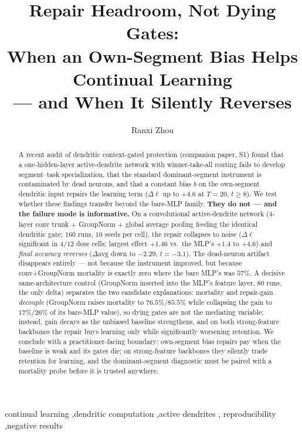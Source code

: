 \documentclass[review]{elsarticle}
\begin{document}
\begin{frontmatter}

\title{Repair Headroom, Not Dying Gates:\\
When an Own-Segment Bias Helps Continual Learning\\
--- and When It Silently Reverses}

\author[inst1]{Ranxi Zhou}

\begin{abstract}
A recent audit of dendritic context-gated protection (companion paper,
S1) found that a one-hidden-layer active-dendrite network with
winner-take-all routing fails to develop segment--task specialization,
that the standard dominant-segment instrument is contaminated by dead
neurons, and that a constant bias $b$ on the own-segment dendritic
input repairs the learning term ($\Delta\ell$ up to $+4.6$ at
$T{=}20$, $t \ge 8$). We test whether these findings transfer beyond
the bare-MLP family. \textbf{They do not --- and the failure mode is
informative.} On a convolutional active-dendrite network
(4-layer conv trunk + GroupNorm + global average pooling feeding the
identical dendritic gate; $160$ runs, $10$ seeds per cell), the
repair collapses to noise ($\Delta\ell$ significant in $4/12$ dose
cells; largest effect $+1.46$ vs.\ the MLP's $+1.4$ to $+4.6$) and
\emph{final accuracy reverses} ($\Delta\mathrm{avg}$ down to $-2.29$,
$t{=}-3.1$). The dead-neuron artifact disappears entirely --- not
because the instrument improved, but because conv+GroupNorm mortality
is exactly zero where the bare MLP's was $57\%$. A decisive
same-architecture control (GroupNorm inserted into the MLP's feature
layer, $80$ runs, the only delta) separates the two candidate
explanations: mortality and repair-gain \emph{decouple} (GroupNorm
raises mortality to $76.5\%$/$85.5\%$ while collapsing the gain to
$17\%$/$26\%$ of its bare-MLP value), so dying gates are not the
mediating variable; instead, gain decays as the unbiased baseline
strengthens, and on both strong-feature backbones the repair buys
learning only while significantly worsening retention. We conclude
with a practitioner-facing boundary: own-segment bias repairs pay
when the baseline is weak and its gates die; on strong-feature
backbones they silently trade retention for learning, and the
dominant-segment diagnostic must be paired with a mortality probe
before it is trusted anywhere.
\end{abstract}

\begin{keyword}
continual learning \sep dendritic computation \sep active dendrites \sep
reproducibility \sep negative results
\end{keyword}

\end{frontmatter}
\end{document}
